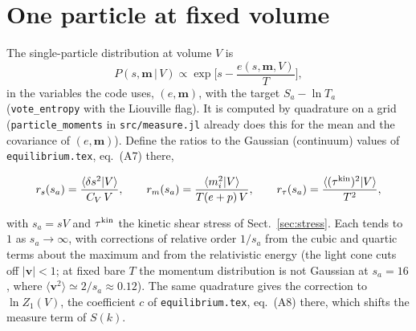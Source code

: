 \documentclass[11pt,aps,preprint,nofootinbib,superscriptaddress,tightenlines]{revtex4-2}
\newcommand{\avg}[1]{\langle #1\rangle}
\def\st{\begin{equation}}
\def\stp{\end{equation}}
\def\Sect#1{Sect.~\ref{#1}}
\begin{document}
\section{One particle at fixed volume}
\label{sec:single}

The single-particle distribution at volume $V$ is
\st
P(s,\bm m\,|\,V)\propto\exp\Big[s-\frac{e(s,\bm m,V)}{T}\Big],
\stp
in the variables the code uses, $(e,\bm m)$, with the target $S_a-\ln T_a$ (\texttt{vote\_entropy} with the Liouville flag).  It is computed by
quadrature on a grid (\texttt{particle\_moments} in \texttt{src/measure.jl} already does this for the mean and the covariance of $(e,\bm m)$).
Define the ratios to the Gaussian (continuum) values of \texttt{equilibrium.tex}, eq.~(A7) there,
\begin{keyeq}
\st
r_s(s_a)=\frac{\avg{\delta s^2|V}}{C_V\,V},\qquad r_m(s_a)=\frac{\avg{m_i^2|V}}{T(e+p)\,V},\qquad r_\tau(s_a)=\frac{\avg{(\tau^{\rm kin})^2|V}}{T^2},
\label{ratios}
\stp
\end{keyeq}
with $s_a=sV$ and $\tau^{\rm kin}$ the kinetic shear stress of \Sect{sec:stress}.  Each tends to $1$ as $s_a\to\infty$, with corrections of relative order
$1/s_a$ from the cubic and quartic terms about the maximum and from the relativistic energy (the light cone cuts off $|\bm v|<1$; at fixed
bare $T$ the momentum distribution is not Gaussian at $s_a=16$, where $\avg{\bm v^2}\simeq2/s_a\approx0.12$).  The same quadrature gives the
correction to $\ln Z_1(V)$, the coefficient $c$ of \texttt{equilibrium.tex}, eq.~(A8) there, which shifts the measure term of $S(k)$.
\end{document}
